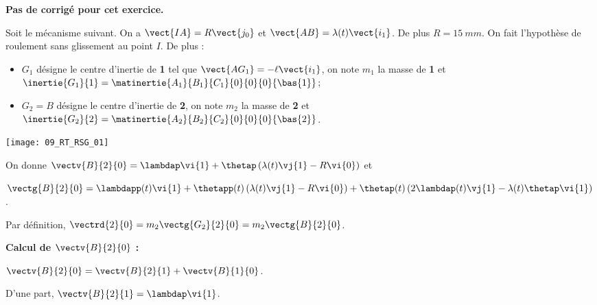 \normalfalse \difficiletrue \tdifficilefalse
\correctiontrue


\setcounter{question}{0}
\ifcorrection
\else
\textbf{Pas de corrigé pour cet exercice.}
\fi

\ifprof
\else
Soit le mécanisme suivant. On a $\vect{IA}=R\vect{j_0}$ et $\vect{AB}=\lambda(t)\vect{i_1}$. De plus $R=\SI{15}{mm}$.
On fait l'hypothèse de roulement sans glissement au point $I$. De plus :
\begin{itemize}
\item $G_1$ désigne le centre d'inertie de \textbf{1} tel que $\vect{AG_1}=-\ell\vect{i_1}$, on note $m_1$ la masse de \textbf{1} et $\inertie{G_1}{1}=\matinertie{A_1}{B_1}{C_1}{0}{0}{0}{\bas{1}}$; 
\item $G_2=B$ désigne le centre d'inertie de \textbf{2}, on note $m_2$ la masse de \textbf{2} et $\inertie{G_2}{2}=\matinertie{A_2}{B_2}{C_2}{0}{0}{0}{\bas{2}}$.
\end{itemize}
\begin{center}
\texttt{[image: 09\_RT\_RSG\_01]}
\end{center}

On donne  $\vectv{B}{2}{0} = \lambdap\vi{1} + \thetap\left(\lambda(t)\vj{1}-R\vi{0} \right)$
et

$\vectg{B}{2}{0}  = \lambdapp(t)\vi{1} %
+ \thetapp(t)\left(\lambda(t)\vj{1}-R\vi{0} \right)
+ \thetap(t)\left(2\lambdap(t)\vj{1}-\lambda(t)\thetap\vi{1} \right)
$.


\fi



\ifprof

Par définition, $\vectrd{2}{0} =  m_2 \vectg{G_2}{2}{0}=  m_2 \vectg{B}{2}{0}$.

\vspace{.5cm}

\textbf{Calcul de $ \vectv{B}{2}{0}$ :}

$\vectv{B}{2}{0}=\vectv{B}{2}{1}+\vectv{B}{1}{0}$.

D'une part,  $\vectv{B}{2}{1}=\lambdap\vi{1}$.

